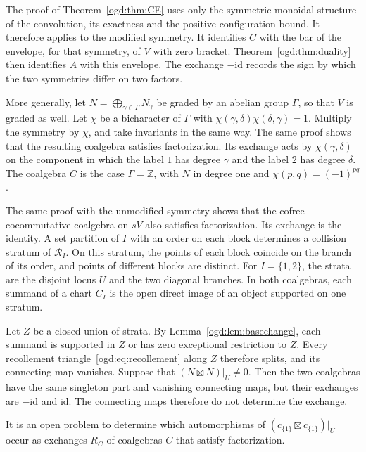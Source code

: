 The proof of Theorem~\ref{ogd:thm:CE} uses only the symmetric monoidal structure of the convolution, its exactness and the positive configuration bound.
It therefore applies to the modified symmetry.
It identifies \(C\) with the bar of the envelope, for that symmetry, of \(V\) with zero bracket.
Theorem~\ref{ogd:thm:duality} then identifies \(A\) with this envelope.
The exchange \(-\mathrm{id}\) records the sign by which the two symmetries differ on two factors.

More\label{ogd:def:bicharacter-graded-coefficients} generally, let \(N=\bigoplus_{\gamma\in\Gamma}N_\gamma\) be graded by an abelian group \(\Gamma\), so that \(V\) is graded as well.
Let \(\chi\) be a bicharacter of \(\Gamma\) with \(\chi(\gamma,\delta)\chi(\delta,\gamma)=1\).
Multiply the symmetry by \(\chi\), and take invariants in the same way.
The same proof shows that the resulting coalgebra satisfies factorization.
Its exchange acts by \(\chi(\gamma,\delta)\) on the component in which the label \(1\) has degree \(\gamma\) and the label \(2\) has degree \(\delta\).
The coalgebra \(C\) is the case \(\Gamma=\mathbb Z\), with \(N\) in degree one and \(\chi(p,q)=(-1)^{pq}\).

The same proof with the unmodified symmetry shows that the cofree cocommutative coalgebra on \(sV\) also satisfies factorization.
Its exchange is the identity.
A set partition of \(I\) with an order on each block determines a collision stratum of \(\mathscr R_I\).
On this stratum, the points of each block coincide on the branch of its order, and points of different blocks are distinct.
For \(I=\{1,2\}\), the strata are the disjoint locus \(U\) and the two diagonal branches.
In both coalgebras, each summand of a chart \(C_I\) is the open direct image of an object supported on one stratum.

Let\label{ogd:def:closed-collision-strata-union} \(Z\) be a closed union of strata.
By Lemma~\ref{ogd:lem:basechange}, each summand is supported in \(Z\) or has zero exceptional restriction to \(Z\).
Every recollement triangle~\eqref{ogd:eq:recollement} along \(Z\) therefore splits, and its connecting map vanishes.
Suppose that \((N\boxtimes N)|_U\ne0\).
Then the two coalgebras have the same singleton part and vanishing connecting maps, but their exchanges are \(-\mathrm{id}\) and \(\mathrm{id}\).
The connecting maps therefore do not determine the exchange.

It is an open problem to determine which automorphisms of \((c_{\{1\}}\boxtimes c_{\{1\}})|_U\) occur as exchanges \(R_C\) of coalgebras \(C\) that satisfy factorization.
